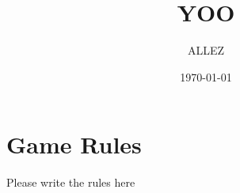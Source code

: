 \documentclass{article}%
\title{YOO}%
\author{ALLEZ}%
\date{\today}%
\begin{document}
%
\normalsize%
\maketitle%
\section{Game Rules}%
\label{sec:GameRules}%
Please write the rules here

%
\end{document}
